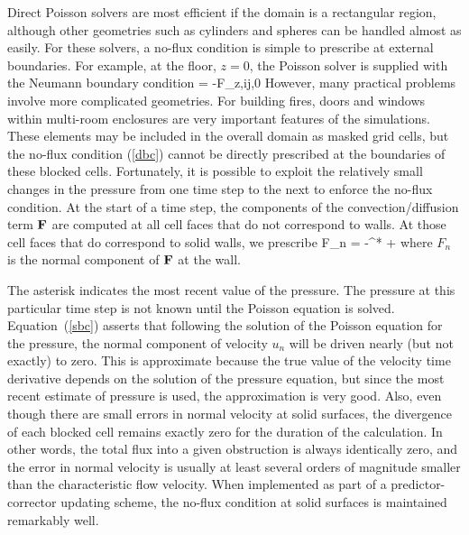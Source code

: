 \documentclass[11pt]{book}
\begin{document}
Direct Poisson solvers are most efficient if the domain is a
rectangular region, although other geometries such as cylinders
and spheres can be handled almost as easily. For these solvers,
a no-flux condition
is simple to prescribe at external boundaries.
For example, at the floor, $z=0$, the Poisson solver is
supplied with the Neumann boundary condition
\be {} = -F_{z,ij,0} \label{dbc} \ee
However, many practical problems involve more
complicated geometries. For building fires,
doors and windows within multi-room enclosures are very important features
of the simulations. These elements may be included
in the overall domain as masked grid cells,
but the no-flux condition (\ref{dbc}) cannot be directly prescribed
at the boundaries of these blocked cells.
Fortunately, it is possible to exploit
the relatively small changes in the pressure from one time
step to the next to enforce the no-flux condition.
At the start of a time step,
the components of the convection/diffusion term ${\bf F}$ are computed
at all cell faces that do not correspond to walls.
At those cell faces that do correspond to solid walls, we prescribe
\be
F_n = -^* +  \label{sbc}
\ee
where $F_n$ is the normal component of ${\bf F}$ at the wall.

The asterisk indicates the most recent value of the pressure. The pressure at this
particular time step is not known until the Poisson equation is solved.
Equation~(\ref{sbc}) asserts that following the solution of the Poisson
equation for the pressure, the normal component of velocity $u_n$ will
be driven nearly (but not exactly) to zero.
This is approximate because the true value of the velocity time
derivative depends on the solution of the pressure equation, but since
the most recent estimate of pressure is used, the approximation is very
good. Also, even though there are small errors in normal velocity at solid
surfaces, the divergence of each blocked cell
remains exactly zero for the duration of the calculation.
In other words, the total flux into a given obstruction is always identically
zero, and the error in normal velocity is usually at least
several orders of magnitude smaller than the characteristic flow velocity.
When implemented as part of a predictor-corrector updating scheme,
the no-flux condition at solid surfaces is maintained remarkably well.
\end{document}
